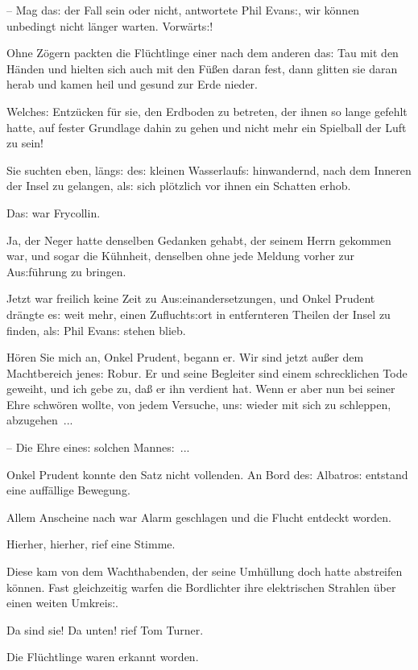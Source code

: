 \documentclass[oneside,12pt]{book}
\newcommand{\s}{s:}
\begin{document}
-- Mag da{\s} der Fall sein oder nicht, antwortete Phil Evan{\s}, wir
k\"onnen unbedingt nicht l\"anger warten. Vorw\"art{\s}!{\grqq}

Ohne Z\"ogern packten die Fl\"uchtlinge einer nach dem anderen da{\s}
Tau mit den H\"anden und hielten sich auch mit den F\"u{\ss}en daran
fest, dann glitten sie daran herab und kamen heil und gesund zur Erde
nieder.

Welche{\s} Ent\/z\"ucken f\"ur sie, den Erdboden zu betreten, der ihnen
so lange gefehlt hatte, auf fester Grundlage dahin zu gehen und nicht
mehr ein Spielball der Luft zu sein!

Sie suchten eben, l\"ang{\s} de{\s} kleinen Wasserlauf{\s}
hinwandernd, nach dem Inneren der Insel zu gelangen, al{\s} sich
pl\"otzlich vor ihnen ein Schatten erhob.

Da{\s} war Frycollin.

Ja, der Neger hatte denselben Gedanken gehabt, der seinem Herrn
gekommen war, und sogar die K\"uhnheit, denselben ohne jede Meldung
vorher zur Au{\s}f\"uhrung zu bringen.

Jetzt war freilich keine Zeit zu Au{\s}einandersetzungen, und Onkel
Prudent dr\"angte e{\s} weit mehr, einen Zuflucht{\s}ort in entfernteren
Theilen der Insel zu finden, al{\s} Phil Evan{\s} stehen blieb.

{\glqq}H\"oren Sie mich an, Onkel Prudent, begann er. Wir sind jetzt
au{\ss}er dem Machtbereich jene{\s} Robur. Er und seine Begleiter
sind einem schrecklichen Tode geweiht, und ich gebe zu, da{\ss} er
ihn verdient hat. Wenn er aber nun bei seiner Ehre schw\"oren wollte,
von jedem Versuche, un{\s} wieder mit sich zu schleppen,
abzugehen~...

-- Die Ehre eine{\s} solchen Manne{\s}~...{\grqq}

Onkel Prudent konnte den Satz nicht vollenden. An Bord de{\s}
{\glqq}Albatro{\s}{\grqq} entstand eine auf\/f\"allige Bewegung.

Allem Anscheine nach war Alarm geschlagen und die Flucht entdeckt
worden.

{\glqq}Hierher, hierher,{\grqq} rief eine Stimme.

Diese kam von dem Wachthabenden, der seine Umh\"ullung doch hatte
abstreifen k\"onnen. Fast gleichzeitig warfen die Bordlichter ihre
elektrischen Strahlen \"uber einen weiten Umkrei{\s}.

{\glqq}Da sind sie! Da unten!{\grqq} rief Tom Turner.

Die Fl\"uchtlinge waren erkannt worden.
\end{document}
